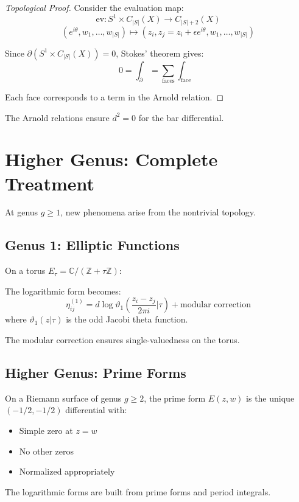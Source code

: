 \begin{proof}[Topological Proof]
Consider the evaluation map:
$$\text{ev}: S^1 \times C_{|S|}(X) \to C_{|S|+2}(X)$$
$$(e^{i\theta}, w_1, \ldots, w_{|S|}) \mapsto (z_i, z_j = z_i + \epsilon e^{i\theta}, w_1, \ldots, w_{|S|})$$

Since $\partial(S^1 \times C_{|S|}(X)) = 0$, Stokes' theorem gives:
$$0 = \int_{\partial} = \sum_{\text{faces}} \int_{\text{face}}$$

Each face corresponds to a term in the Arnold relation.
\end{proof}

\begin{corollary}
The Arnold relations ensure $d^2 = 0$ for the bar differential.
\end{corollary}

\section{Higher Genus: Complete Treatment}

At genus $g \geq 1$, new phenomena arise from the nontrivial topology.

\subsection{Genus 1: Elliptic Functions}

On a torus $E_\tau = \mathbb{C}/(\mathbb{Z} + \tau\mathbb{Z})$:

\begin{theorem}
The logarithmic form becomes:
$$\eta_{ij}^{(1)} = d\log\vartheta_1\left(\frac{z_i - z_j}{2\pi i}\Big|\tau\right) + \text{modular correction}$$
where $\vartheta_1(z|\tau)$ is the odd Jacobi theta function.
\end{theorem}

The modular correction ensures single-valuedness on the torus.

\subsection{Higher Genus: Prime Forms}

\begin{definition}
On a Riemann surface of genus $g \geq 2$, the prime form $E(z,w)$ is the unique $(-1/2, -1/2)$ differential with:
\begin{itemize}
\item Simple zero at $z = w$
\item No other zeros
\item Normalized appropriately
\end{itemize}
\end{definition}

The logarithmic forms are built from prime forms and period integrals.